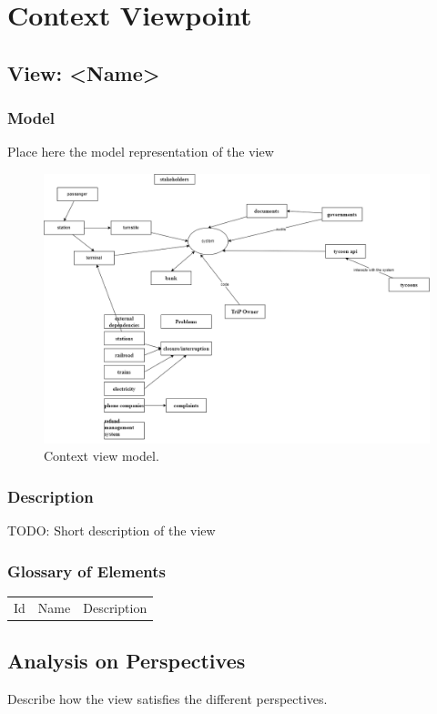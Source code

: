 \section{Context Viewpoint}
\subsection*{View: \textless{}Name\textgreater{}}
\subsubsection*{Model}
Place here the model representation of the view
\begin{figure}[ht]
    \centering
    \includegraphics[width=\textwidth]{drawings/views_draft1/context_view_draft1.png}
    \caption{Context view model.}
    \label{fig:context_view_model}
\end{figure}

\subsubsection*{Description}
TODO: Short description of the view

\subsubsection*{Glossary of Elements}
\begin{longtable}{lll}
Id & Name & Description \\
\end{longtable}

\subsection*{Analysis on Perspectives}
Describe how the view satisfies the different perspectives. 


